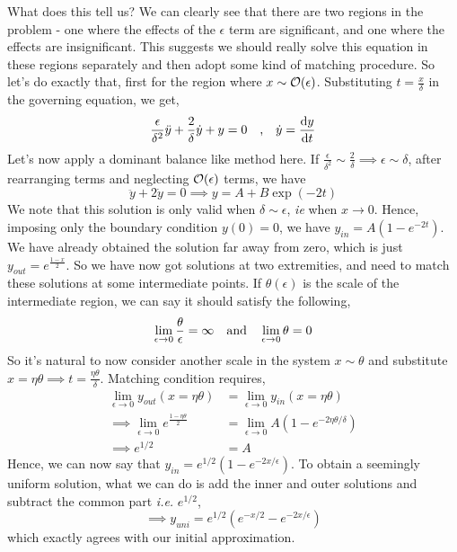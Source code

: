\documentclass[a4paper,11pt]{article}
\begin{document}
What does this tell us? We can clearly see that there are two regions in the problem - one where the effects of the $ \epsilon $ term are significant, and one where the effects are insignificant. This suggests we should really solve this equation in these regions separately and then adopt some kind of matching procedure. So let's do exactly that, first for the region where $ x \sim \order{\epsilon} $. Substituting $ t = \frac{x}{\delta} $ in the governing equation, we get,
\begin{equation*}
\dfrac{\epsilon}{\delta^2} \ddot{y} + \dfrac{2}{\delta} \dot{y} + y = 0 \qq{,} \dot{y} = \dv{y}{t}
\end{equation*}
Let's now apply a dominant balance like method here. If $ \frac{\epsilon}{\delta^2} \sim \frac{2}{\delta}  \implies \epsilon \sim \delta$, after rearranging terms and neglecting $ \order{\epsilon} $ terms, we have
\begin{equation*}
\ddot{y} + 2 \dot{y} = 0 \implies y = A + B \exp(-2t) 
\end{equation*}
We note that this solution is only valid when $ \delta \sim \epsilon $, \textit{ie} when $ x \rightarrow 0 $. Hence, imposing only the boundary condition $ y(0) = 0 $, we have $ y_{in} = A(1 - e^{-2t}) $. We have already obtained the solution far away from zero, which is just $ y_{out} =e^{\frac{1-x}{2}}  $. So we have now got solutions at two extremities, and need to match these solutions at some intermediate points. If $ \theta(\epsilon) $ is the scale of the intermediate region, we can say it should satisfy the following,
\begin{equation*}
\lim\limits_{\epsilon \rightarrow 0} \dfrac{\theta}{\epsilon} = \infty \qq{and} \lim\limits_{\epsilon \rightarrow 0} \theta = 0
\end{equation*}
So it's natural to now consider another scale in the system $ x \sim \theta $ and substitute $ x = \eta \theta \implies t = \frac{\eta \theta}{\delta}$. Matching condition requires,
\begin{align*}
\lim\limits_{\epsilon \rightarrow 0} y_{out}(x=\eta \theta) &= \lim\limits_{\epsilon \rightarrow 0} y_{in}( x =\eta \theta) \\
\implies \lim\limits_{\epsilon \rightarrow 0}e^{\frac{1 - \eta \theta}{2}} &= \lim\limits_{\epsilon \rightarrow 0}A( 1 - e^{-2 \eta \theta/\delta}) \\
\implies e^{1/2} &= A
\end{align*}
Hence, we can now say that $ y_{in} =   e^{1/2}(1 - e^{-2x/\epsilon})$. To obtain a seemingly uniform solution, what we can do is add the inner and outer solutions and subtract the common part \textit{i.e.} $ e^{1/2} $,
\begin{equation*}
\implies y_{uni} = e^{1/2}(e^{-x/2} - e^{-2x/\epsilon})
\end{equation*}
which exactly agrees with our initial approximation.
\end{document}
